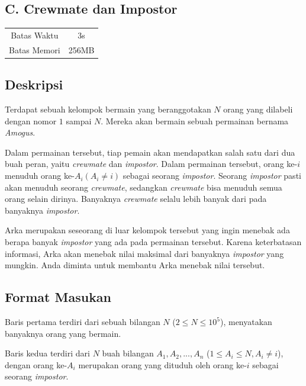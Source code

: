 \documentclass{article}
\begin{document}
\begin{center}
    \section*{C. Crewmate dan Impostor} %

    \begin{tabular}{ | c c | }
        \hline
        Batas Waktu  & 3s \\    %
        Batas Memori & 256MB \\  %
        \hline
    \end{tabular}
\end{center}

\subsection*{Deskripsi}
Terdapat sebuah kelompok bermain yang beranggotakan $N$ orang yang dilabeli dengan nomor $1$ sampai $N$. Mereka akan bermain sebuah permainan bernama \textit{Amogus}.

Dalam permainan tersebut, tiap pemain akan mendapatkan salah satu dari dua buah peran, yaitu \textit{crewmate} dan \textit{impostor}. Dalam permainan tersebut, orang ke-$i$ menuduh orang ke-$A_i (A_i \neq i)$ sebagai seorang \textit{impostor}. Seorang \textit{impostor} pasti akan menuduh seorang \textit{crewmate}, sedangkan \textit{crewmate} bisa menuduh semua orang selain dirinya. Banyaknya \textit{crewmate} selalu lebih banyak dari pada banyaknya \textit{impostor}.

Arka merupakan seseorang di luar kelompok tersebut yang ingin menebak ada berapa banyak \textit{impostor} yang ada pada permainan tersebut. Karena keterbatasan informasi, Arka akan menebak nilai maksimal dari banyaknya \textit{impostor} yang mungkin. Anda diminta untuk membantu Arka menebak nilai tersebut.

\subsection*{Format Masukan}
Baris pertama terdiri dari sebuah bilangan $N$ ($2 \leq N \leq 10^5$), menyatakan banyaknya orang yang bermain.

Baris kedua terdiri dari $N$ buah bilangan $A_1, A_2, ..., A_n$ ($1 \leq A_i \leq N, A_i \neq i$), dengan orang ke-$A_i$ merupakan orang yang dituduh oleh orang ke-$i$ sebagai seorang \textit{impostor}. 
\end{document}
